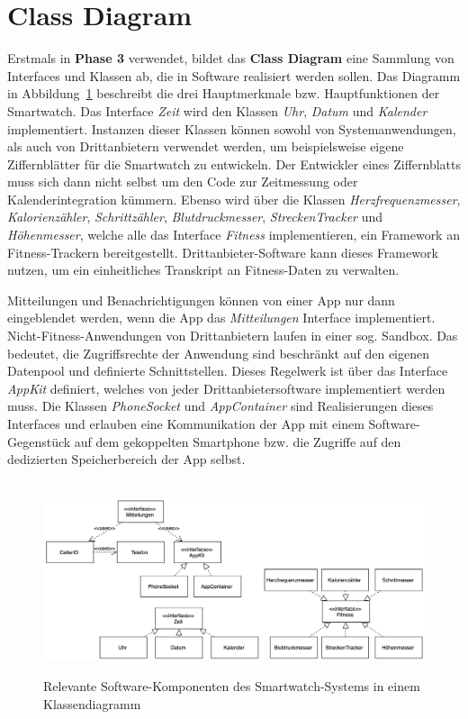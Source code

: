 \section{Class Diagram}

Erstmals in \textbf{Phase 3} verwendet, bildet das \textbf{Class Diagram} eine Sammlung von Interfaces und Klassen ab, die in Software realisiert werden sollen. Das Diagramm in Abbildung~\ref{fig:class} beschreibt die drei Hauptmerkmale bzw. Hauptfunktionen der Smartwatch. Das Interface \emph{Zeit} wird den Klassen \emph{Uhr}, \emph{Datum} und \emph{Kalender} implementiert. Instanzen dieser Klassen können sowohl von Systemanwendungen, als auch von Drittanbietern verwendet werden, um beispielsweise eigene Ziffernblätter für die Smartwatch zu entwickeln. Der Entwickler eines Ziffernblatts muss sich dann nicht selbst um den Code zur Zeitmessung oder Kalenderintegration kümmern. Ebenso wird über die Klassen \emph{Herzfrequenzmesser}, \emph{Kalorienzähler}, \emph{Schrittzähler}, \emph{Blutdruckmesser}, \emph{StreckenTracker} und \emph{Höhenmesser}, welche alle das Interface \emph{Fitness} implementieren, ein Framework an Fitness-Trackern bereitgestellt. Drittanbieter-Software kann dieses Framework nutzen, um ein einheitliches Transkript an Fitness-Daten zu verwalten.

Mitteilungen und Benachrichtigungen können von einer App nur dann eingeblendet werden, wenn die App das \emph{Mitteilungen} Interface implementiert. Nicht-Fitness-Anwendungen von Drittanbietern laufen in einer sog. \gls{Sandbox}. Das bedeutet, die Zugriffsrechte der Anwendung sind beschränkt auf den eigenen Datenpool und definierte Schnittstellen. Dieses Regelwerk ist über das Interface \emph{AppKit} definiert, welches von jeder Drittanbietersoftware implementiert werden muss. Die Klassen \emph{PhoneSocket} und \emph{AppContainer} sind Realisierungen dieses Interfaces und erlauben eine Kommunikation der App mit einem Software-Gegenstück auf dem gekoppelten Smartphone bzw. die Zugriffe auf den dedizierten Speicherbereich der App selbst.

\begin{figure}[h]
\centering\
\includegraphics[width=\textwidth]{img/classdiagram}
\caption[Class Diagram: Software-Komponenten]{Relevante Software-Komponenten des Smartwatch-Systems in einem Klassendiagramm}\label{fig:class}
\end{figure}

